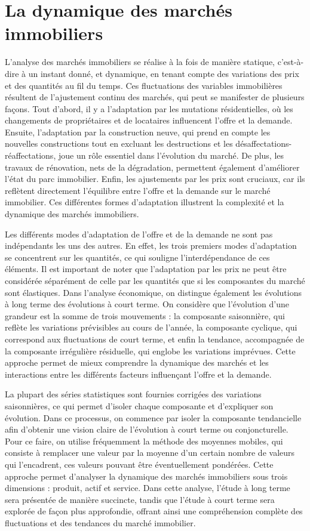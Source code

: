 \documentclass[a4paper, 12pt]{report}
\begin{document}
\chapter{La dynamique des marchés immobiliers}

L'analyse des marchés immobiliers se réalise à la fois de manière statique, c'est-à-dire à un instant donné, et dynamique, en tenant compte des variations des prix et des quantités au fil du temps. Ces fluctuations des variables immobilières résultent de l'ajustement continu des marchés, qui peut se manifester de plusieurs façons. Tout d'abord, il y a l'adaptation par les mutations résidentielles, où les changements de propriétaires et de locataires influencent l'offre et la demande. Ensuite, l'adaptation par la construction neuve, qui prend en compte les nouvelles constructions tout en excluant les destructions et les désaffectations-réaffectations, joue un rôle essentiel dans l'évolution du marché. De plus, les travaux de rénovation, nets de la dégradation, permettent également d'améliorer l'état du parc immobilier. Enfin, les ajustements par les prix sont cruciaux, car ils reflètent directement l'équilibre entre l'offre et la demande sur le marché immobilier. Ces différentes formes d'adaptation illustrent la complexité et la dynamique des marchés immobiliers.

Les différents modes d'adaptation de l'offre et de la demande ne sont pas indépendants les uns des autres. En effet, les trois premiers modes d'adaptation se concentrent sur les quantités, ce qui souligne l'interdépendance de ces éléments. Il est important de noter que l'adaptation par les prix ne peut être considérée séparément de celle par les quantités que si les composantes du marché sont élastiques. Dans l'analyse économique, on distingue également les évolutions à long terme des évolutions à court terme. On considère que l'évolution d'une grandeur est la somme de trois mouvements : la composante saisonnière, qui reflète les variations prévisibles au cours de l'année, la composante cyclique, qui correspond aux fluctuations de court terme, et enfin la tendance, accompagnée de la composante irrégulière résiduelle, qui englobe les variations imprévues. Cette approche permet de mieux comprendre la dynamique des marchés et les interactions entre les différents facteurs influençant l'offre et la demande.

La plupart des séries statistiques sont fournies corrigées des variations saisonnières, ce qui permet d'isoler chaque composante et d'expliquer son évolution. Dans ce processus, on commence par isoler la composante tendancielle afin d'obtenir une vision claire de l'évolution à court terme ou conjoncturelle. Pour ce faire, on utilise fréquemment la méthode des moyennes mobiles, qui consiste à remplacer une valeur par la moyenne d'un certain nombre de valeurs qui l'encadrent, ces valeurs pouvant être éventuellement pondérées. Cette approche permet d'analyser la dynamique des marchés immobiliers sous trois dimensions : produit, actif et service. Dans cette analyse, l'étude à long terme sera présentée de manière succincte, tandis que l'étude à court terme sera explorée de façon plus approfondie, offrant ainsi une compréhension complète des fluctuations et des tendances du marché immobilier.
\end{document}
